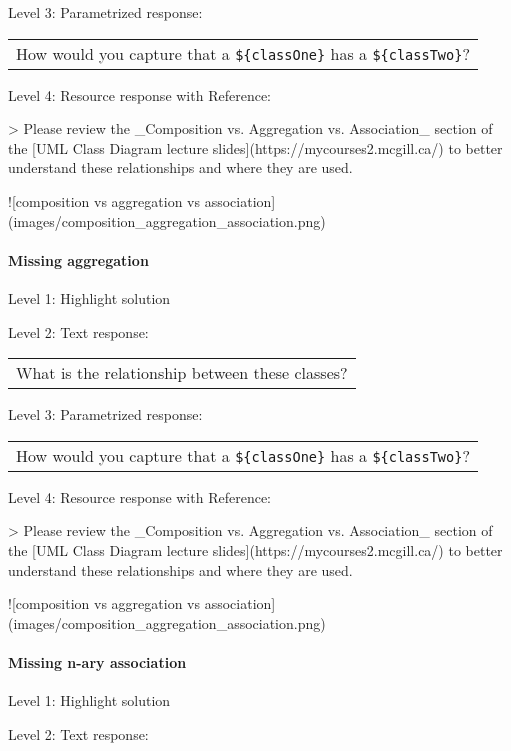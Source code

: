 \noindent Level 3: Parametrized response: \medskip

\begin{tabular}{|c}
How would you capture that a \verb|${classOne}| has a \verb|${classTwo}|?
\end{tabular} \medskip

\noindent Level 4: Resource response with Reference:

> Please review the _Composition vs. Aggregation vs. Association_ section of 
the [UML Class Diagram lecture slides](https://mycourses2.mcgill.ca/) to 
better understand these relationships and where they are used.

![composition vs aggregation vs association](images/composition_aggregation_association.png)


\paragraph{Missing aggregation}

\noindent Level 1: Highlight solution \medskip

\noindent Level 2: Text response: \medskip

\begin{tabular}{|c}
What is the relationship between these classes?
\end{tabular} \medskip

\noindent Level 3: Parametrized response: \medskip

\begin{tabular}{|c}
How would you capture that a \verb|${classOne}| has a \verb|${classTwo}|?
\end{tabular} \medskip

\noindent Level 4: Resource response with Reference:

> Please review the _Composition vs. Aggregation vs. Association_ section of 
the [UML Class Diagram lecture slides](https://mycourses2.mcgill.ca/) to 
better understand these relationships and where they are used.

![composition vs aggregation vs association](images/composition_aggregation_association.png)


\paragraph{Missing n-ary association}

\noindent Level 1: Highlight solution \medskip

\noindent Level 2: Text response: \medskip

